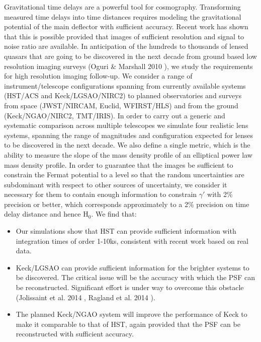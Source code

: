 \documentclass[a4paper,11pt]{article}
\begin{document}
{Gravitational time delays are a powerful tool for
cosmography. Transforming measured time delays into time distances
requires modeling the gravitational potential of the main deflector
with sufficient accuracy. Recent work has shown that this is possible
provided that images of sufficient resolution and signal to noise
ratio are available. In anticipation of the hundreds to thousands of
lensed quasars that are going to be discovered in the next decade from
ground based low resolution imaging surveys
(Oguri \& Marshall 2010 \cite{2010MNRAS.405.2579O}),
we study the requirements for high
resolution imaging follow-up. We consider a range of
instrument/telescope configurations spanning from currently available
systems (HST/ACS and Keck/LGSAO/NIRC2) to planned observatories and
surveys from space (JWST/NIRCAM, Euclid, WFIRST/HLS) and from the
ground (Keck/NGAO/NIRC2, TMT/IRIS). In order to carry out a generic
and systematic comparison across multiple telescopes we simulate four
realistic lens systems, spanning the range of magnitudes and
configuration expected for lenses to be discovered in the next
decade. We also define a single metric, which is the ability to
measure the slope of the mass density profile of an elliptical power
law mass density profile. In order to guarantee that the images be
sufficient to constrain the Fermat potential to a level so that the
random uncertainties are subdominant with respect to other sources of
uncertainty, we consider it necessary for them to contain enough
information to constrain $\gamma'$ with 2\% precision or better, which
corresponds approximately to a 2\% precision on time delay distance
and hence H$_0$. We find that:

\begin{itemize}

\item Our simulations show that HST can provide sufficient information
with integration times of order 1-10ks, consistent with recent work based
on real data.

\item Keck/LGSAO can provide sufficient information for the brighter
systems to be discovered. The critical issue will be the accuracy with
which the PSF can be reconstructed. Significant effort is under way to
overcome this obstacle (Jolissaint et al. 2014
\cite{2014SPIE.9148E..4SJ}, Ragland et al. 2014
\cite{2014SPIE.9148E..0SR}).

\item The planned Keck/NGAO system will improve the performance of
Keck to make it comparable to that of HST, again provided that the PSF can
be reconstructed with sufficient accuracy.


\end{itemize}}
\end{document}
